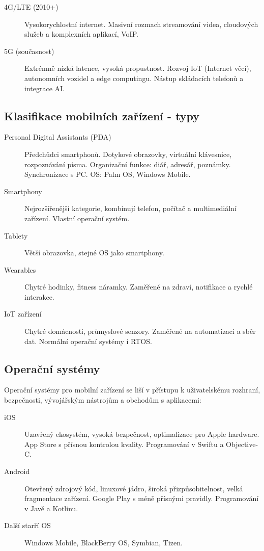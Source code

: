 \begin{description}
    \item[4G/LTE (2010+)] Vysokorychlostní internet. Masivní rozmach streamování videa, cloudových služeb a komplexních aplikací, VoIP.
    
    \item[5G (současnost)] Extrémně nízká latence, vysoká propustnost. Rozvoj IoT (Internet věcí), autonomních vozidel a edge computingu. Nástup skládacích telefonů a integrace AI.
\end{description}

\subsection{Klasifikace mobilních zařízení - typy}

\begin{description}
    \item[Personal Digital Assistants (PDA)] Předchůdci smartphonů. Dotykové obrazovky, virtuální klávesnice, rozpoznávání písma. Organizační funkce: diář, adresář, poznámky. Synchronizace s PC. OS: Palm OS, Windows Mobile.
    
    \item[Smartphony] Nejrozšířenější kategorie, kombinují telefon, počítač a multimediální zařízení. Vlastní operační systém.
    
    \item[Tablety] Větší obrazovka, stejné OS jako smartphony.
    
    \item[Wearables] Chytré hodinky, fitness náramky. Zaměřené na zdraví, notifikace a rychlé interakce.
    
    \item[IoT zařízení] Chytré domácnosti, průmyslové senzory. Zaměřené na automatizaci a sběr dat. Normální operační systémy i RTOS.
\end{description}

\subsection{Operační systémy}

Operační systémy pro mobilní zařízení se liší v přístupu k uživatelskému rozhraní, bezpečnosti, 
vývojářským nástrojům a obchodům s aplikacemi:

\begin{description}
    \item[iOS] Uzavřený ekosystém, vysoká bezpečnost, optimalizace pro Apple hardware. App Store s přísnou kontrolou kvality. Programování v Swiftu a Objective-C.
    
    \item[Android] Otevřený zdrojový kód, linuxové jádro, široká přizpůsobitelnost, velká fragmentace zařízení. Google Play s méně přísnými pravidly. Programování v Javě a Kotlinu.
    
    \item[Další starří OS] Windows Mobile, BlackBerry OS, Symbian, Tizen.
\end{description}

